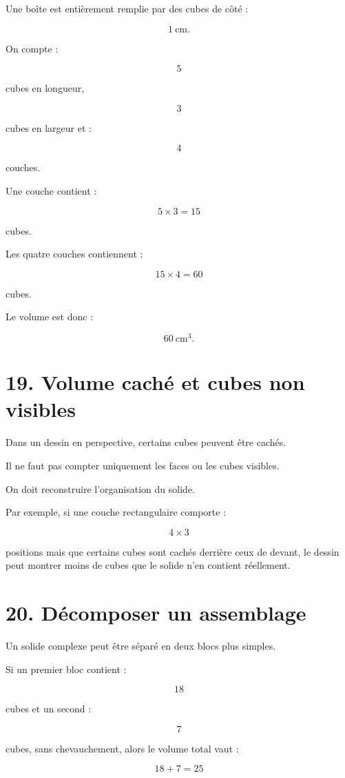 Une boîte est entièrement remplie par des cubes de côté :

\[
1\ \text{cm}.
\]

On compte :

\[
5
\]

cubes en longueur,

\[
3
\]

cubes en largeur et :

\[
4
\]

couches.

Une couche contient :

\[
5\times3=15
\]

cubes.

Les quatre couches contiennent :

\[
15\times4=60
\]

cubes.

Le volume est donc :

\[
\boxed{60\ \text{cm}^3}.
\]

\section{19. Volume caché et cubes non visibles}

Dans un dessin en perspective, certains cubes peuvent être cachés.

Il ne faut pas compter uniquement les faces ou les cubes visibles.

On doit reconstruire l’organisation du solide.

Par exemple, si une couche rectangulaire comporte :

\[
4\times3
\]

positions mais que certains cubes sont cachés derrière ceux de devant, le dessin peut montrer moins de cubes que le solide n’en contient réellement.

\section{20. Décomposer un assemblage}

Un solide complexe peut être séparé en deux blocs plus simples.

Si un premier bloc contient :

\[
18
\]

cubes et un second :

\[
7
\]

cubes, sans chevauchement, alors le volume total vaut :

\[
18+7=25
\]

